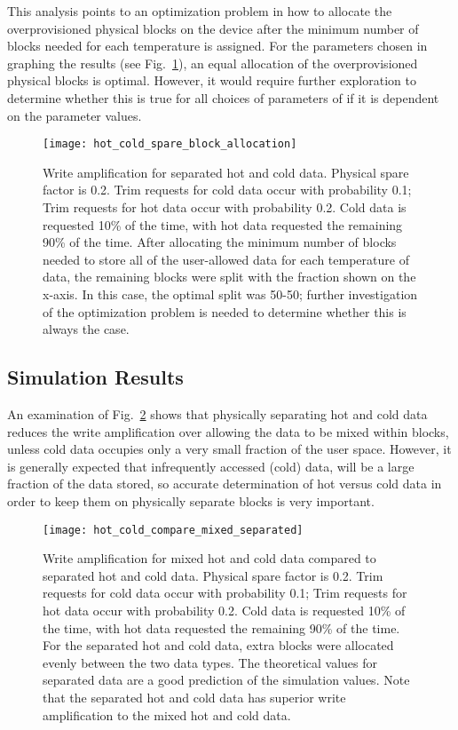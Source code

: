 \documentclass[prodmode,acmtos]{acmsmall}
\begin{document}
This analysis points to an optimization problem in how to allocate the overprovisioned physical blocks on the device after the minimum number of blocks needed for each temperature is assigned.  For the parameters chosen in graphing the results (see Fig.~\ref{fig:hot_cold_spare_block_allocation}), an equal allocation of the overprovisioned physical blocks is optimal.  However, it would require further exploration to determine whether this is true for all choices of parameters of if it is dependent on the parameter values.

\begin{figure}
\centerline{\texttt{[image: hot\_cold\_spare\_block\_allocation]}}
\caption{Write amplification for separated hot and cold data.  Physical spare factor is 0.2.  Trim requests for cold data occur with probability 0.1; Trim requests for hot data occur with probability 0.2.  Cold data is requested 10\% of the time, with hot data requested the remaining 90\% of the time.  After allocating the minimum number of blocks needed to store all of the user-allowed data for each temperature of data, the remaining blocks were split with the fraction shown on the x-axis.  In this case, the optimal split was 50-50; further investigation of the optimization problem is needed to determine whether this is always the case.}
\label{fig:hot_cold_spare_block_allocation}
\end{figure}

\subsection{Simulation Results}
An examination of Fig.~\ref{fig:hot_cold_compare_mixed_separated} shows that physically separating hot and cold data reduces the write amplification over allowing the data to be mixed within blocks, unless cold data occupies only a very small fraction of the user space.  However, it is generally expected that infrequently accessed (cold) data, will be a large fraction of the data stored, so accurate determination of hot versus cold data in order to keep them on physically separate blocks is very important.

\begin{figure}
\centerline{\texttt{[image: hot\_cold\_compare\_mixed\_separated]}}
\caption{Write amplification for mixed hot and cold data compared to separated hot and cold data.  Physical spare factor is 0.2.  Trim requests for cold data occur with probability 0.1; Trim requests for hot data occur with probability 0.2.  Cold data is requested 10\% of the time, with hot data requested the remaining 90\% of the time.  For the separated hot and cold data, extra blocks were allocated evenly between the two data types.  The theoretical values for separated data are a good prediction of the simulation values.  Note that the separated hot and cold data has superior write amplification to the mixed hot and cold data.}
\label{fig:hot_cold_compare_mixed_separated}
\end{figure}
\end{document}
